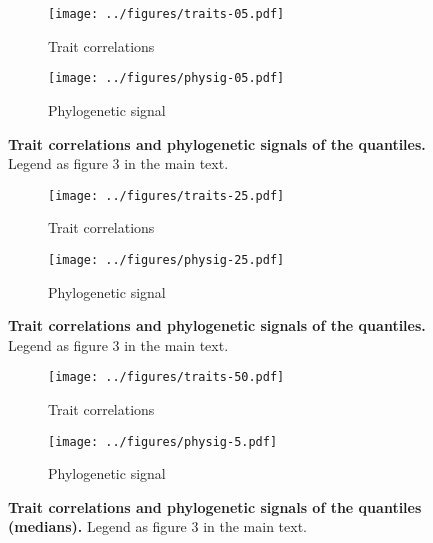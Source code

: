 \documentclass[12pt]{report}
\begin{document}
\begin{figure}[h!]
  \begin{center}
    \begin{subfigure}{.45\textwidth}
      \texttt{[image: ../figures/traits-05.pdf]}
      \caption{Trait correlations}
    \end{subfigure}
    \begin{subfigure}{.45\textwidth}
      \texttt{[image: ../figures/physig-05.pdf]}
      \caption{Phylogenetic signal}
    \end{subfigure}
  \end{center}
  \caption{\textbf{Trait correlations and phylogenetic signals of the
       quantiles.} Legend as figure 3 in the main text.}
  \label{traits}
\end{figure}
\begin{figure}[h!]
  \begin{center}
    \begin{subfigure}{.45\textwidth}
      \texttt{[image: ../figures/traits-25.pdf]}
      \caption{Trait correlations}
    \end{subfigure}
    \begin{subfigure}{.45\textwidth}
      \texttt{[image: ../figures/physig-25.pdf]}
      \caption{Phylogenetic signal}
    \end{subfigure}
  \end{center}
  \caption{\textbf{Trait correlations and phylogenetic signals of the
       quantiles.} Legend as figure 3 in the main text.}
  \label{traits}
\end{figure}
\begin{figure}[h!]
  \begin{center}
    \begin{subfigure}{.45\textwidth}
      \texttt{[image: ../figures/traits-50.pdf]}
      \caption{Trait correlations}
    \end{subfigure}
    \begin{subfigure}{.45\textwidth}
      \texttt{[image: ../figures/physig-5.pdf]}
      \caption{Phylogenetic signal}
    \end{subfigure}
  \end{center}
  \caption{\textbf{Trait correlations and phylogenetic signals of the
       quantiles (medians).} Legend as figure 3 in the main
    text.}
  \label{traits}
\end{figure}
\end{document}
